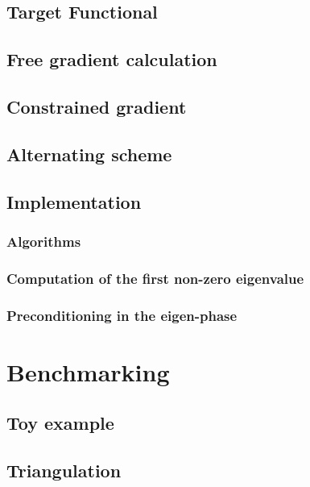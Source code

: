 \subsection{ Target Functional }


\subsection{ Free gradient calculation }


\subsection{ Constrained gradient }


\subsection{ Alternating scheme }


\subsection{ Implementation }

\subsubsection{ Algorithms }

\subsubsection{ Computation of the first non-zero eigenvalue }

\subsubsection{ Preconditioning in the eigen-phase }







\section{ Benchmarking }

\subsection{ Toy example }


\subsection{ Triangulation }

